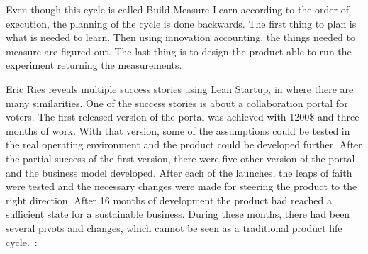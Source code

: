 Even though this cycle is called Build-Measure-Learn according to the order of execution, the planning of the cycle is done backwards. The first thing to plan is what is needed to learn. Then using innovation accounting, the things needed to measure are figured out. The last thing is to design the product able to run the experiment returning the measurements.~\cite{ries2011lean}

 Eric Ries reveals multiple success stories using Lean Startup, in where there are many similarities. One of the success stories is about a collaboration portal for voters. The first released version of the portal was achieved with 1200\$ and three months of work. With that version, some of the assumptions could be tested in the real operating environment and the product could be developed further. After the partial success of the first version, there were five other version of the portal and the business model developed. After each of the launches, the leaps of faith were tested and the necessary changes were made for steering the product to the right direction. After 16 months of development the product had reached a sufficient state for a sustainable business. During these months, there had been several pivots and changes, which cannot be seen as a traditional product life cycle.~\cite{ries2011lean}:





 
 
 


 
 
 